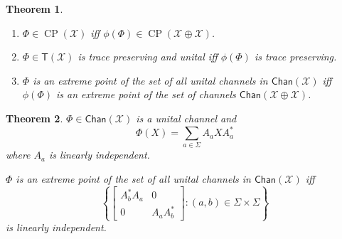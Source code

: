 \documentclass[aps,pra,onecolumn,notitlepage,superscriptaddress]{revtex4-1}
\newcommand{\spc}[1]{\mathcal{#1}}
\newcommand{\T}{\mathsf{T}}
\newcommand{\op}[1]{\operatorname{#1}}
\newcommand{\Chan}{{\mathsf{Chan}}}
\newtheorem{theo}{Theorem}
\begin{document}
    \begin{theo}
        \begin{enumerate}
            \item $\Phi \in \op{CP}(\spc X)$ iff $\phi(\Phi) \in \op{CP}(\spc X \oplus \spc X)$.
            \item $\Phi \in \T(\spc X)$ is trace preserving and unital iff $\phi(\Phi)$ is trace preserving.
            \item $\Phi$ is an extreme point of the set of all
            unital channels in $\Chan(\spc X)$ iff $\phi(\Phi)$ is an extreme point of the set of channels $\Chan(\spc X \oplus \spc X)$.
        \end{enumerate}
    \end{theo}

    \begin{theo}
        $\Phi \in \Chan(\spc X)$ is a unital channel and
        \begin{equation}
            \Phi(X) = \sum_{a \in \Sigma} A_a X A_a^*
        \end{equation}
        where $A_a$ is linearly independent.

        $\Phi$ is an extreme point of the set of all unital channels in $\Chan(\spc X)$ iff
        \begin{equation}
            \left\{ \begin{bmatrix}
                A_b^*A_a & 0 \\
                0 & A_aA_b^*
            \end{bmatrix} : (a,b) \in \Sigma \times \Sigma \right\}
        \end{equation}
        is linearly independent.
    \end{theo}
\end{document}
